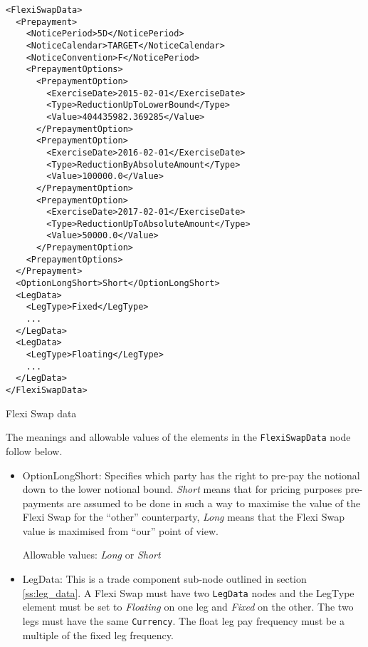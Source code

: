 \begin{listing}[H]
\begin{verbatim}
<FlexiSwapData>
  <Prepayment>
    <NoticePeriod>5D</NoticePeriod>
    <NoticeCalendar>TARGET</NoticeCalendar>
    <NoticeConvention>F</NoticePeriod>
    <PrepaymentOptions>
      <PrepaymentOption>
        <ExerciseDate>2015-02-01</ExerciseDate>
        <Type>ReductionUpToLowerBound</Type>
        <Value>404435982.369285</Value>
      </PrepaymentOption>
      <PrepaymentOption>
        <ExerciseDate>2016-02-01</ExerciseDate>
        <Type>ReductionByAbsoluteAmount</Type>
        <Value>100000.0</Value>
      </PrepaymentOption>
      <PrepaymentOption>
        <ExerciseDate>2017-02-01</ExerciseDate>
        <Type>ReductionUpToAbsoluteAmount</Type>
        <Value>50000.0</Value>
      </PrepaymentOption>
    <PrepaymentOptions>
  </Prepayment>
  <OptionLongShort>Short</OptionLongShort>
  <LegData>
    <LegType>Fixed</LegType>
    ...
  </LegData>
  <LegData>
    <LegType>Floating</LegType>
    ...
  </LegData>
</FlexiSwapData>
\end{verbatim}
\caption{Flexi Swap data}
\label{lst:flexiswap_data2}
\end{listing}

The meanings and allowable values of the elements in the \lstinline!FlexiSwapData!  node follow below.

\begin{itemize}

\item OptionLongShort: Specifies which party has the right to pre-pay the notional down to the lower notional
  bound. \emph{Short} means that for pricing purposes pre-payments are assumed to be done in such a way to maximise the
  value of the Flexi Swap for the ``other'' counterparty, \emph{Long} means that the Flexi Swap value is maximised from
  ``our'' point of view.

Allowable values: \emph{Long} or \emph{Short}

\item LegData: This is a trade component sub-node outlined in section \ref{ss:leg_data}. A Flexi Swap must have two
  \lstinline!LegData! nodes and the LegType element must be set to \emph{Floating} on one leg and \emph{Fixed} on the
  other. The two legs must have the same \lstinline!Currency!. The float leg pay frequency must be a multiple of the
  fixed leg frequency.

\end{itemize}

